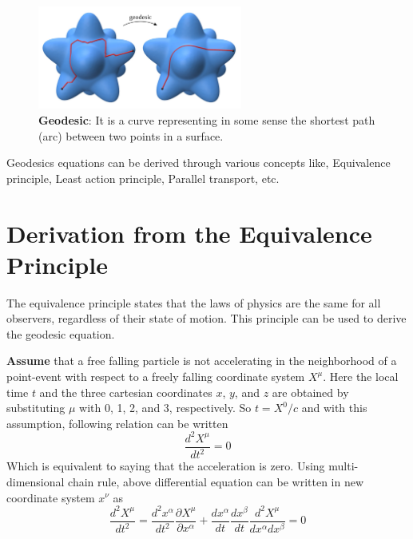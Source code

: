 \documentclass[a4paper, 12pt]{article}
\begin{document}
\begin{figure}[h]
    \centering
    \includegraphics[width=0.6\textwidth]{IMG/flip_geodesic.png}
    \caption{{\bf Geodesic}: It is a curve representing in some sense the shortest path (arc) between two points in a surface.}
    \label{fig:geodesic}
\end{figure}

Geodesics equations can be derived through various concepts like, Equivalence principle, Least action
principle, Parallel transport, etc.

\section*{Derivation from the Equivalence Principle}
The equivalence principle states that the laws of physics are the same for all observers, regardless of their state of motion. This principle can be used to derive the geodesic equation.

{\bf Assume} that a free falling particle is not accelerating in the neighborhood of a point-event with respect to a freely falling coordinate system $X^\mu$. Here the local time $t$ and the three cartesian coordinates $x$, $y$, and $z$ are obtained by substituting $\mu$ with 0, 1, 2, and 3, respectively. So $t=X^0/c$ and
with this assumption, following relation can be written
\begin{equation}
    \frac{d^2X^\mu}{dt^2} = 0
\end{equation}
Which is equivalent to saying that the acceleration is zero. Using multi-dimensional chain rule, above
differential equation can be written in new coordinate system $x^\nu$ as
\begin{equation}\label{eq:geodesic}
    \frac{d^2X^\mu}{dt^2} = \frac{d^2x^\alpha}{dt^2} \frac{\partial X^{\mu}}{\partial x^{\alpha}} + \frac{dx^\alpha}{dt}\frac{dx^\beta}{dt} \frac{d^2X^{\mu}}{dx^{\alpha}dx^{\beta}}=0
\end{equation}
\end{document}
